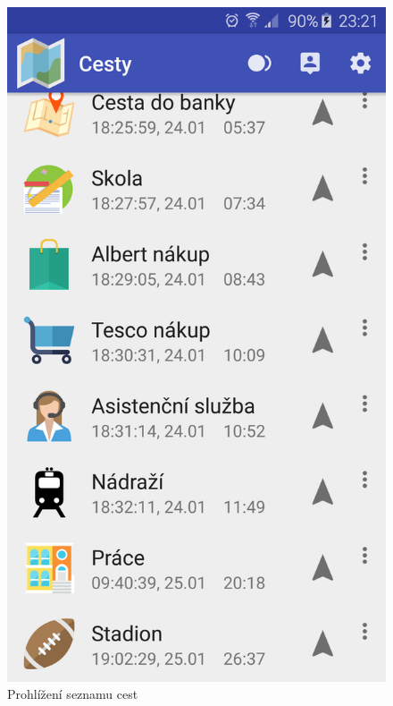 \documentclass{article}
\begin{document}
\begin{figure}[H]
\begin{minipage}{.5\textwidth}
\centering
                \includegraphics[scale=0.14]{img/screen/seznamcest.png}
        \caption{Prohlížení seznamu cest}
        \label{fig:prohlizeniasistent}
\end{minipage}
\begin{minipage}{.5\textwidth}
    \centering

\end{minipage}
\end{figure}
\end{document}
